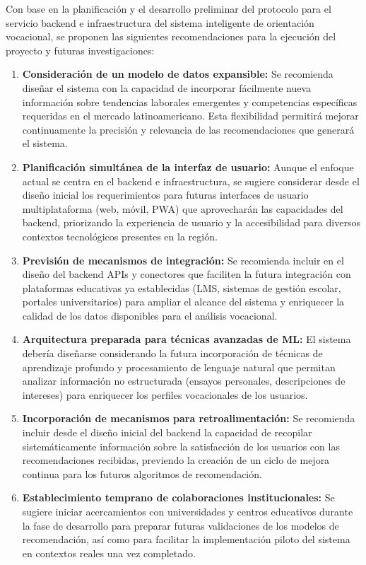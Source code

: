 Con base en la planificación y el desarrollo preliminar del protocolo para el servicio backend e infraestructura del sistema inteligente de orientación vocacional, se proponen las siguientes recomendaciones para la ejecución del proyecto y futuras investigaciones:
\begin{enumerate}
\item \textbf{Consideración de un modelo de datos expansible:} Se recomienda diseñar el sistema con la capacidad de incorporar fácilmente nueva información sobre tendencias laborales emergentes y competencias específicas requeridas en el mercado latinoamericano. Esta flexibilidad permitirá mejorar continuamente la precisión y relevancia de las recomendaciones que generará el sistema.
\item \textbf{Planificación simultánea de la interfaz de usuario:} Aunque el enfoque actual se centra en el backend e infraestructura, se sugiere considerar desde el diseño inicial los requerimientos para futuras interfaces de usuario multiplataforma (web, móvil, PWA) que aprovecharán las capacidades del backend, priorizando la experiencia de usuario y la accesibilidad para diversos contextos tecnológicos presentes en la región.
\item \textbf{Previsión de mecanismos de integración:} Se recomienda incluir en el diseño del backend APIs y conectores que faciliten la futura integración con plataformas educativas ya establecidas (LMS, sistemas de gestión escolar, portales universitarios) para ampliar el alcance del sistema y enriquecer la calidad de los datos disponibles para el análisis vocacional.
\item \textbf{Arquitectura preparada para técnicas avanzadas de ML:} El sistema debería diseñarse considerando la futura incorporación de técnicas de aprendizaje profundo y procesamiento de lenguaje natural que permitan analizar información no estructurada (ensayos personales, descripciones de intereses) para enriquecer los perfiles vocacionales de los usuarios.
\item \textbf{Incorporación de mecanismos para retroalimentación:} Se recomienda incluir desde el diseño inicial del backend la capacidad de recopilar sistemáticamente información sobre la satisfacción de los usuarios con las recomendaciones recibidas, previendo la creación de un ciclo de mejora continua para los futuros algoritmos de recomendación.
\item \textbf{Establecimiento temprano de colaboraciones institucionales:} Se sugiere iniciar acercamientos con universidades y centros educativos durante la fase de desarrollo para preparar futuras validaciones de los modelos de recomendación, así como para facilitar la implementación piloto del sistema en contextos reales una vez completado.

\end{enumerate}
